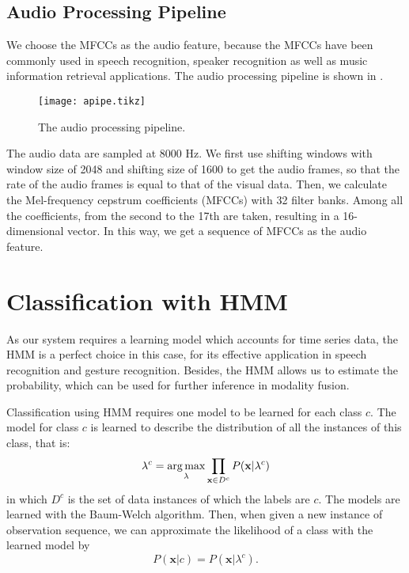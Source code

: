 \documentclass[12pt,final,twoside]{report}
\begin{document}
\subsection{Audio Processing Pipeline}
We choose the MFCCs as the audio feature, because the MFCCs have been commonly used in speech recognition, speaker recognition as well as music information retrieval applications. The audio processing pipeline is shown in .

\begin{figure}[t]
  \centering
  \texttt{[image: apipe.tikz]}
  \caption{The audio processing pipeline.}
  \label{fig:apipe}
\end{figure}

The audio data are sampled at 8000 Hz. We first use shifting windows with window size of 2048 and shifting size of 1600 to get the audio frames, so that the rate of the audio frames is equal to that of the visual data. Then, we calculate the Mel-frequency cepstrum coefficients (MFCCs) with 32 filter banks. Among all the coefficients, from the second to the 17th are taken, resulting in a 16-dimensional vector. In this way, we get a sequence of MFCCs as the audio feature.

\section{Classification with HMM}
As our system requires a learning model which accounts for time series data, the HMM is a perfect choice in this case, for its effective application in speech recognition and gesture recognition. Besides, the HMM allows us to estimate the probability, which can be used for further inference in modality fusion.

Classification using HMM requires one model to be learned for each class $c$. The model for class $c$ is learned to describe the distribution of all the instances of this class, that is:
\begin{equation}
  \lambda^c = \operatorname*{arg\,max}_{\lambda} \prod_{\mathbf{x} \in D^c} P(\mathbf{x}|\lambda^c)
\end{equation}
in which $D^c$ is the set of data instances of which the labels are $c$. The models are learned with the Baum-Welch algorithm. Then, when given a new instance of observation sequence, we can approximate the likelihood of a class with the learned model by
\begin{equation}
  P(\mathbf{x}|c) = P(\mathbf{x}|\lambda^c) .
\end{equation}
\end{document}
